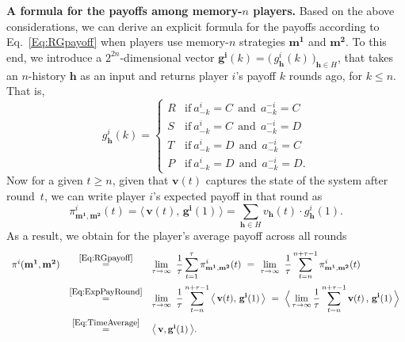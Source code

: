 \documentclass[11pt]{article}
\theoremstyle{plainCl1}
\theoremstyle{plainCl2}
\begin{document}
\noindent
{\bf A formula for the payoffs among memory-$n$ players.} Based on the above considerations, we can derive an explicit formula for the payoffs according to Eq.~\eqref{Eq:RGpayoff} when players use memory-$n$ strategies $\mathbf{m^1}$ and $\mathbf{m^2}$. 
To this end, we introduce a $2^{2n}$-dimensional vector $\mathbf{g^i}(k)\!=\!\big(\,g^i_\mathbf{h}(k)\,\big)_{\mathbf{h}\in H}$, that takes an $n$-history $\mathbf{h}$ as an input and returns player $i$'s payoff $k$ rounds ago, for $k\!\le\!n$. 
That is, 
\begin{equation}\label{Eq:g(k)}
    g_\mathbf{h}^i(k) = \left\{
    \begin{array}{cl}
    R	&\text{if}~ a_{-k}^i\!=\!C~~\text{and}~~a_{-k}^{-i}\!=\!C\\[0.1cm]
    S	&\text{if}~ a_{-k}^i\!=\!C~~\text{and}~~ a_{-k}^{-i}\!=\!D\\[0.1cm]
    T	&\text{if}~ a_{-k}^i\!=\!D~~\text{and}~~ a_{-k}^{-i}\!=\!C\\[0.1cm]
    P	&\text{if}~ a_{-k}^i\!=\!D~~\text{and}~~ a_{-k}^{-i}\!=\!D.
    \end{array}
    \right.
\end{equation}
Now for a given $t\!\ge\!n$, given that  $\mathbf{v}(t)$ captures the state of the system after round~$t$, we can write player $i$'s expected payoff in that round as
\begin{equation} \label{Eq:ExpPayRound}
\pi^i_{\mathbf{m^1},\mathbf{m^2}}(t) = \big\langle \,\mathbf{v}(t),\, \mathbf{g^i}(1)\,\big\rangle = \sum_{\mathbf{h}\in H} v_\mathbf{h}(t) \cdot g^i_\mathbf{h}(1). 
\end{equation}
As a result, we obtain for the player's average payoff across all rounds
\begin{equation} \label{Eq:PayoffMemoryn}
\begin{array}{rcl}
\pi^i(\mathbf{m^1},\mathbf{m^2}) 
&\stackrel{\mbox{\small \eqref{Eq:RGpayoff}}}{=}  
&\displaystyle \lim_{\tau \to \infty}~ \frac{1}{\tau} \sum_{t=1}^{\tau} \pi^i_{\mathbf{m^1},\mathbf{m^2}}(t)
~=~
\lim_{\tau \to \infty}~ \frac{1}{\tau} \sum_{t=n}^{n+\tau-1} \pi^i_{\mathbf{m^1},\mathbf{m^2}}(t)\\[0.5cm]
&\stackrel{\mbox{\small \eqref{Eq:ExpPayRound}}}{=}  
&\displaystyle \lim_{\tau \to \infty}~ \frac{1}{\tau} \sum_{t=n}^{n+\tau-1}\big\langle \,\mathbf{v}(t),\, \mathbf{g^i}(1)\,\big\rangle
~=~
\Big\langle \lim_{\tau \to \infty} \frac{1}{\tau} \sum_{t=n}^{n+\tau-1} \mathbf{v}(t)\, , \, \mathbf{g^i}(1)\,\Big\rangle\\[0.5cm]
&\stackrel{\mbox{\small \eqref{Eq:TimeAverage}}}{=}  
&\big\langle\, \mathbf{v}, \mathbf{g^i}(1)\,\big\rangle .
\end{array}
\end{equation}
\end{document}
